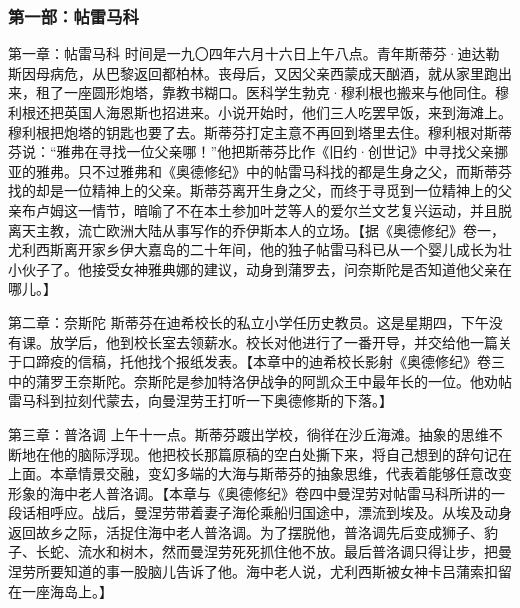 \subsubsection*{第一部：帖雷马科}
\par 第一章：帖雷马科 时间是一九〇四年六月十六日上午八点。青年斯蒂芬·迪达勒斯因母病危，从巴黎返回都柏林。丧母后，又因父亲西蒙成天酗酒，就从家里跑出来，租了一座圆形炮塔，靠教书糊口。医科学生勃克·穆利根也搬来与他同住。穆利根还把英国人海恩斯也招进来。小说开始时，他们三人吃罢早饭，来到海滩上。穆利根把炮塔的钥匙也要了去。斯蒂芬打定主意不再回到塔里去住。穆利根对斯蒂芬说：“雅弗在寻找一位父亲哪！”他把斯蒂芬比作《旧约·创世记》中寻找父亲挪亚的雅弗。只不过雅弗和《奥德修纪》中的帖雷马科找的都是生身之父，而斯蒂芬找的却是一位精神上的父亲。斯蒂芬离开生身之父，而终于寻觅到一位精神上的父亲布卢姆这一情节，暗喻了不在本土参加叶芝等人的爱尔兰文艺复兴运动，并且脱离天主教，流亡欧洲大陆从事写作的乔伊斯本人的立场。【据《奥德修纪》卷一，尤利西斯离开家乡伊大嘉岛的二十年间，他的独子帖雷马科已从一个婴儿成长为壮小伙子了。他接受女神雅典娜的建议，动身到蒲罗去，问奈斯陀是否知道他父亲在哪儿。】
\par 第二章：奈斯陀 斯蒂芬在迪希校长的私立小学任历史教员。这是星期四，下午没有课。放学后，他到校长室去领薪水。校长对他进行了一番开导，并交给他一篇关于口蹄疫的信稿，托他找个报纸发表。【本章中的迪希校长影射《奥德修纪》卷三中的蒲罗王奈斯陀。奈斯陀是参加特洛伊战争的阿凯众王中最年长的一位。他劝帖雷马科到拉刻代蒙去，向曼涅劳王打听一下奥德修斯的下落。】
\par 第三章：普洛调 上午十一点。斯蒂芬踱出学校，徜徉在沙丘海滩。抽象的思维不断地在他的脑际浮现。他把校长那篇原稿的空白处撕下来，将自己想到的辞句记在上面。本章情景交融，变幻多端的大海与斯蒂芬的抽象思维，代表着能够任意改变形象的海中老人普洛调。【本章与《奥德修纪》卷四中曼涅劳对帖雷马科所讲的一段话相呼应。战后，曼涅劳带着妻子海伦乘船归国途中，漂流到埃及。从埃及动身返回故乡之际，活捉住海中老人普洛调。为了摆脱他，普洛调先后变成狮子、豹子、长蛇、流水和树木，然而曼涅劳死死抓住他不放。最后普洛调只得让步，把曼涅劳所要知道的事一股脑儿告诉了他。海中老人说，尤利西斯被女神卡吕蒲索扣留在一座海岛上。】

